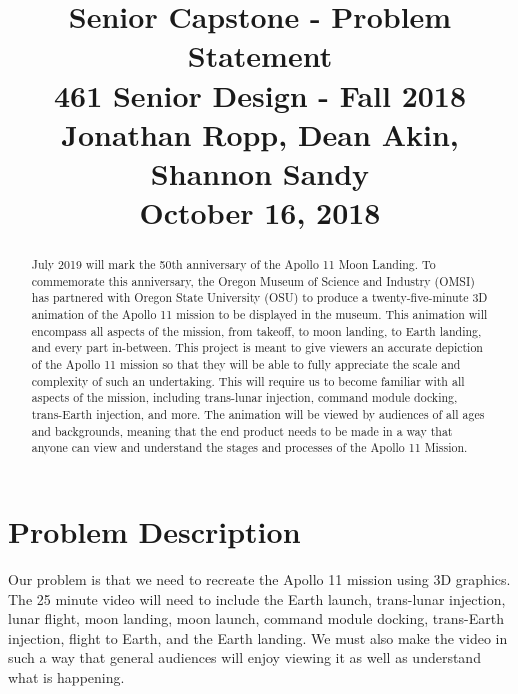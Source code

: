 \documentclass[onecolumn, draftclsnofoot,10pt, compsoc]{IEEEtran}
\begin{document}
\title{Senior Capstone - Problem Statement\\
	\large 461 Senior Design - Fall 2018\\
	\large Jonathan Ropp, Dean Akin, Shannon Sandy\\
	\large October 16, 2018}

\maketitle

\begin{abstract}

July 2019 will mark the 50th anniversary of the Apollo 11 Moon Landing. To commemorate this anniversary, the Oregon Museum of Science and Industry (OMSI) has partnered with Oregon State University (OSU) to produce a twenty-five-minute 3D animation of the Apollo 11 mission to be displayed in the museum. This animation will encompass all aspects of the mission, from takeoff, to moon landing, to Earth landing, and every part in-between. This project is meant to give viewers an accurate depiction of the Apollo 11 mission so that they will be able to fully appreciate the scale and complexity of such an undertaking. This will require us to become familiar with all aspects of the mission, including trans-lunar injection, command module docking, trans-Earth injection, and more. The animation will be viewed by audiences of all ages and backgrounds, meaning that the end product needs to be made in a way that anyone can view and understand the stages and processes of the Apollo 11 Mission.

\end{abstract}

\section{Problem Description}
Our problem is that we need to recreate the Apollo 11 mission using 3D graphics. The 25 minute video will need to include the Earth launch, trans-lunar injection, lunar flight, moon landing, moon launch, command module docking, trans-Earth injection, flight to Earth, and the Earth landing. We must also make the video in such a way that general audiences will enjoy viewing it as well as understand what is happening.
\end{document}
